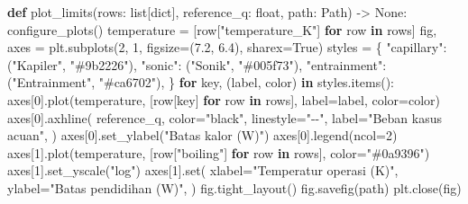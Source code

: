 \documentclass[
  12pt,
  12pt,a4paper,oneside]{report}
\newenvironment{Shaded}{}{}
\newcommand{\BuiltInTok}[1]{\textcolor[rgb]{0.00,0.50,0.00}{#1}}
\newcommand{\ControlFlowTok}[1]{\textcolor[rgb]{0.00,0.44,0.13}{\textbf{#1}}}
\newcommand{\DecValTok}[1]{\textcolor[rgb]{0.25,0.63,0.44}{#1}}
\newcommand{\FloatTok}[1]{\textcolor[rgb]{0.25,0.63,0.44}{#1}}
\newcommand{\KeywordTok}[1]{\textcolor[rgb]{0.00,0.44,0.13}{\textbf{#1}}}
\newcommand{\NormalTok}[1]{#1}
\newcommand{\OperatorTok}[1]{\textcolor[rgb]{0.40,0.40,0.40}{#1}}
\newcommand{\StringTok}[1]{\textcolor[rgb]{0.25,0.44,0.63}{#1}}
\newcommand{\VariableTok}[1]{\textcolor[rgb]{0.10,0.09,0.49}{#1}}
\begin{document}
\begin{Shaded}
\begin{Highlighting}[]
\KeywordTok{def}\NormalTok{ plot\_limits(rows: }\BuiltInTok{list}\NormalTok{[}\BuiltInTok{dict}\NormalTok{], reference\_q: }\BuiltInTok{float}\NormalTok{, path: Path) }\OperatorTok{{-}\textgreater{}} \VariableTok{None}\NormalTok{:}
\NormalTok{    configure\_plots()}
\NormalTok{    temperature }\OperatorTok{=}\NormalTok{ [row[}\StringTok{"temperature\_K"}\NormalTok{] }\ControlFlowTok{for}\NormalTok{ row }\KeywordTok{in}\NormalTok{ rows]}
\NormalTok{    fig, axes }\OperatorTok{=}\NormalTok{ plt.subplots(}\DecValTok{2}\NormalTok{, }\DecValTok{1}\NormalTok{, figsize}\OperatorTok{=}\NormalTok{(}\FloatTok{7.2}\NormalTok{, }\FloatTok{6.4}\NormalTok{), sharex}\OperatorTok{=}\VariableTok{True}\NormalTok{)}
\NormalTok{    styles }\OperatorTok{=}\NormalTok{ \{}
        \StringTok{"capillary"}\NormalTok{: (}\StringTok{"Kapiler"}\NormalTok{, }\StringTok{"\#9b2226"}\NormalTok{),}
        \StringTok{"sonic"}\NormalTok{: (}\StringTok{"Sonik"}\NormalTok{, }\StringTok{"\#005f73"}\NormalTok{),}
        \StringTok{"entrainment"}\NormalTok{: (}\StringTok{"Entrainment"}\NormalTok{, }\StringTok{"\#ca6702"}\NormalTok{),}
\NormalTok{    \}}
    \ControlFlowTok{for}\NormalTok{ key, (label, color) }\KeywordTok{in}\NormalTok{ styles.items():}
\NormalTok{        axes[}\DecValTok{0}\NormalTok{].plot(temperature, [row[key] }\ControlFlowTok{for}\NormalTok{ row }\KeywordTok{in}\NormalTok{ rows], label}\OperatorTok{=}\NormalTok{label, color}\OperatorTok{=}\NormalTok{color)}
\NormalTok{    axes[}\DecValTok{0}\NormalTok{].axhline(}
\NormalTok{        reference\_q, color}\OperatorTok{=}\StringTok{"black"}\NormalTok{, linestyle}\OperatorTok{=}\StringTok{"{-}{-}"}\NormalTok{, label}\OperatorTok{=}\StringTok{"Beban kasus acuan"}\NormalTok{,}
\NormalTok{    )}
\NormalTok{    axes[}\DecValTok{0}\NormalTok{].set\_ylabel(}\StringTok{"Batas kalor (W)"}\NormalTok{)}
\NormalTok{    axes[}\DecValTok{0}\NormalTok{].legend(ncol}\OperatorTok{=}\DecValTok{2}\NormalTok{)}
\NormalTok{    axes[}\DecValTok{1}\NormalTok{].plot(temperature, [row[}\StringTok{"boiling"}\NormalTok{] }\ControlFlowTok{for}\NormalTok{ row }\KeywordTok{in}\NormalTok{ rows], color}\OperatorTok{=}\StringTok{"\#0a9396"}\NormalTok{)}
\NormalTok{    axes[}\DecValTok{1}\NormalTok{].set\_yscale(}\StringTok{"log"}\NormalTok{)}
\NormalTok{    axes[}\DecValTok{1}\NormalTok{].}\BuiltInTok{set}\NormalTok{(}
\NormalTok{        xlabel}\OperatorTok{=}\StringTok{"Temperatur operasi (K)"}\NormalTok{,}
\NormalTok{        ylabel}\OperatorTok{=}\StringTok{"Batas pendidihan (W)"}\NormalTok{,}
\NormalTok{    )}
\NormalTok{    fig.tight\_layout()}
\NormalTok{    fig.savefig(path)}
\NormalTok{    plt.close(fig)}



\end{Highlighting}
\end{Shaded}
\end{document}
